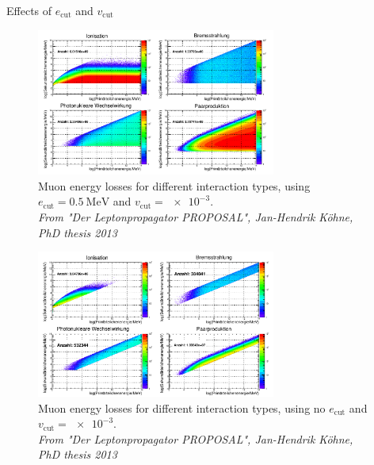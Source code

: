 \documentclass[aspectratio=1610, 9pt]{beamer}
\begin{document}
\begin{frame}
  \begin{center}
    \Huge Effects of $e_\text{cut}$ and $v_\text{cut}$
  \end{center}
\end{frame}


\begin{frame}
            \begin{figure}
                \centering
                \includegraphics[width=0.7\textwidth]{plots/cut_diss_0.5_1e-3.png}
                \caption{Muon energy losses for different interaction types, using $e_\text{cut} = \SI{0.5}{\mega\electronvolt}$ and $v_\text{cut} = \num{e-3}$.\\ \emph{From "Der Leptonpropagator PROPOSAL", Jan-Hendrik Köhne, PhD thesis 2013}}
            \end{figure}
\end{frame}


\begin{frame}
            \begin{figure}
                \centering
                \includegraphics[width=0.7\textwidth]{plots/cut_diss_1e-3.png}
                \caption{Muon energy losses for different interaction types, using no $e_\text{cut}$ and $v_\text{cut} = \num{e-3}$.\\ \emph{From "Der Leptonpropagator PROPOSAL", Jan-Hendrik Köhne, PhD thesis 2013}}
            \end{figure}
\end{frame}
\end{document}
